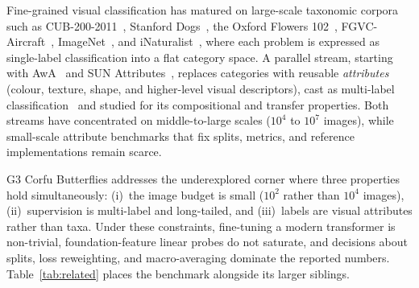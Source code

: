 \documentclass[11pt,a4paper]{article}
\begin{document}
Fine-grained visual classification has matured on large-scale
taxonomic corpora such as CUB-200-2011~\citep{wah2011caltech}, Stanford
Dogs~\citep{khosla2011stanforddogs}, the Oxford Flowers
102~\citep{nilsback2008flowers}, FGVC-Aircraft~\citep{maji2013aircraft},
ImageNet~\citep{russakovsky2015ilsvrc}, and
iNaturalist~\citep{vanhorn2018inaturalist}, where each problem is
expressed as single-label classification into a flat
category space. A parallel stream, starting with
AwA~\citep{lampert2009awa} and SUN
Attributes~\citep{patterson2014sun}, replaces categories with
reusable \emph{attributes} (colour, texture, shape, and higher-level
visual descriptors), cast as multi-label
classification~\citep{tsoumakas2007multilabel} and studied for its
compositional and transfer properties. Both streams have
concentrated on middle-to-large scales ($10^4$ to $10^7$ images),
while small-scale attribute benchmarks that fix splits, metrics,
and reference implementations remain scarce.

G3 Corfu Butterflies addresses the underexplored corner where three
properties hold simultaneously: (i)~the image budget is small ($10^2$
rather than $10^4$ images), (ii)~supervision is multi-label and
long-tailed, and (iii)~labels are visual attributes rather than
taxa. Under these constraints, fine-tuning a modern transformer is
non-trivial, foundation-feature linear probes do not saturate, and
decisions about splits, loss reweighting, and macro-averaging
dominate the reported numbers. Table~\ref{tab:related} places the
benchmark alongside its larger siblings.
\end{document}
